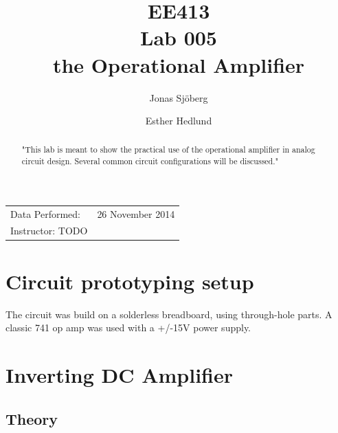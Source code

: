\documentclass[]{article}
\title{EE413 \\ Lab 005 \\ the Operational Amplifier}
\author{{Jonas Sjöberg} \and {Esther Hedlund}}
\date{}
\begin{document}
\maketitle

\begin{center}
\begin{tabular}{l r}
    Data Performed: & 26 November 2014 \\
    Instructor: TODO
\end{tabular}
\end{center}

\begin{abstract}
"This lab is meant to show the practical use of the operational amplifier in
analog circuit design. Several common circuit configurations will be discussed."
\end{abstract}

\newpage

{
\setcounter{tocdepth}{3}
\tableofcontents
}

\newpage

\section{Circuit prototyping setup}\label{setup}
The circuit was build on a solderless breadboard, using through-hole parts.
A classic 741 op amp was used with a +/-15V power supply.

\section{Inverting DC Amplifier}\label{inverting-dc-amplifier}

\subsection{Theory}\label{invDC-theory}
\end{document}

